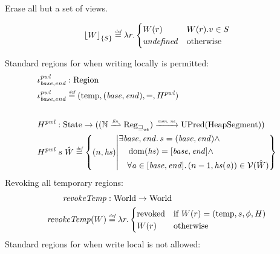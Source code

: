 \documentclass{article}
\DeclarePairedDelimiter\floor{\lfloor}{\rfloor}
\newcommand{\finparfun}{\xrightharpoonup{\textit{\tiny{fin}}}}
\newcommand{\monnefun}{\xrightarrow{\textit{\tiny{mon, ne}}}}
\newcommand{\fun}{\rightarrow}
\newcommand{\defeq}{\stackrel{\textit{\tiny{def}}}{=}}
\DeclareMathOperator{\dom}{dom}
\newcommand{\undefined}{\mathit{undefined}}
\newcommand{\var}[1]{\mathit{#1}}
\newcommand{\hs}{\var{hs}}
\newcommand{\addr}{\var{a}}
\newcommand{\start}{\var{base}}
\newcommand{\addrend}{\var{end}}
\newcommand{\plainfun}[2]{
  \ifthenelse{\equal{#2}{}}
             {\mathit{#1}}
             {\mathit{#1}(#2)}
}
\newcommand{\revokeTemp}[1]{\plainfun{revokeTemp}{#1}}
\newcommand{\erase}[2]{\floor*{#1}_{\{#2\}}}
\newcommand{\futurewk}{\mathbin{\sqsupseteq}_{\var{wk}}}
\newcommand{\asmType}{\plaindom{AsmType}}
\newcommand{\plaindom}[1]{\mathrm{#1}}
\newcommand{\HeapSegments}{\plaindom{HeapSegment}}
\newcommand{\nats}{\mathbb{N}}
\newcommand{\States}{\plaindom{State}}
\newcommand{\Regions}{\plaindom{Region}}
\newcommand{\Reg}{\plaindom{Reg}}
\newcommand{\Regwk}{\Reg_{\futurewk}}
\newcommand{\Worlds}{\plaindom{World}}
\newcommand{\UPred}[1]{\plaindom{UPred}(#1)}
\newcommand{\intr}[2]{\mathcal{#1}}
\newcommand{\valueintr}[1]{\intr{V}{#1}}
\newcommand{\stdvr}{\valueintr{\asmType}}
\newcommand{\npair}[2][n]{\left(#1,#2 \right)}
\newcommand{\plainview}[1]{\mathrm{#1}}
\newcommand{\temp}{\plainview{temp}}
\newcommand{\revoked}{\plainview{revoked}}
\begin{document}
Erase all but a set of views.

\begin{align*}
  \erase{W}{S} \defeq \lambda r \ldotp 
  \begin{cases}
    W(r) & W(r).v \in S\\
    \undefined & \text{otherwise}
  \end{cases}
\end{align*}

Standard regions for when writing locally is permitted:
\begin{align*}
  &\iota_{\start,\addrend}^{\var{pwl}} : \Regions\\
  &\iota_{\start,\addrend}^{\var{pwl}} \defeq (\temp,(\start,\addrend),=,H^{\var{pwl}}) \\ \\
  &H^{\var{pwl}} : \States \fun ((\nats \finparfun \Regwk) \monnefun \UPred{\HeapSegments})\\
  &H^{\var{pwl}} \; s \; \hat{W} \defeq \left\{\npair{\hs} \middle|
    \begin{aligned}
      &\exists \start,\addrend \ldotp s = (\start,\addrend) \land \\
      &\quad \dom(\hs) = [\start,\addrend] \land \\
      &\quad \forall \addr \in [\start,\addrend] \ldotp \npair[n-1]{\hs(\addr)} \in \stdvr(\hat{W})
    \end{aligned}
  \right\}
\end{align*}
Revoking all temporary regions:
\begin{align*}
  \revokeTemp{} & : \Worlds \fun \Worlds \\
  \revokeTemp{W} & \defeq \lambda r \ldotp 
                   \begin{cases}
                     \revoked            & \text{if }W(r) = (\temp,s,\phi,H) \\
                     W(r)                & \text{otherwise}
                   \end{cases}
\end{align*}
Standard regions for when write local is not allowed:
\end{document}
